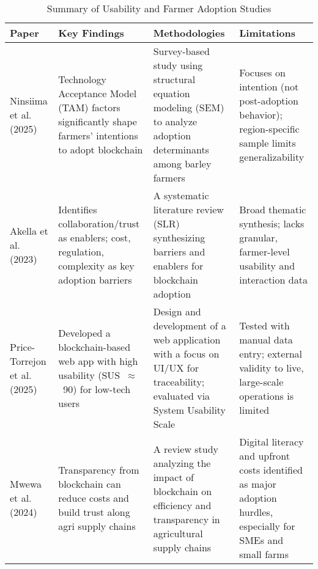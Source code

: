 \documentclass[12pt,onecolumn]{IEEEtran} %
\newcommand{\fitToPage}[1]{\begin{adjustbox}{max width=\textwidth}#1\end{adjustbox}}
\renewcommand{\arraystretch}{1.2} %
\begin{document}
\begin{table}[H]
\caption{Summary of Usability and Farmer Adoption Studies}
\label{table:usability}
\centering
\fitToPage{
\begingroup
\setlength{\tabcolsep}{4pt}
\renewcommand{\arraystretch}{1.15}
\footnotesize
\begin{tabularx}{\textwidth}{@{}P{0.18\textwidth}YYY@{}}
\toprule
\textbf{Paper} & \textbf{Key Findings} & \textbf{Methodologies} & \textbf{Limitations} \\
\midrule
Ninsiima et al. (2025) & Technology Acceptance Model (TAM) factors significantly shape farmers' intentions to adopt blockchain & Survey-based study using structural equation modeling (SEM) to analyze adoption determinants among barley farmers & Focuses on intention (not post-adoption behavior); region-specific sample limits generalizability \\
\addlinespace
Akella et al. (2023) & Identifies collaboration/trust as enablers; cost, regulation, complexity as key adoption barriers & A systematic literature review (SLR) synthesizing barriers and enablers for blockchain adoption & Broad thematic synthesis; lacks granular, farmer-level usability and interaction data \\
\addlinespace
Price-Torrejon et al. (2025) & Developed a blockchain-based web app with high usability (SUS~$\approx$~90) for low-tech users & Design and development of a web application with a focus on UI/UX for traceability; evaluated via System Usability Scale & Tested with manual data entry; external validity to live, large-scale operations is limited \\
\addlinespace
Mwewa et al. (2024) & Transparency from blockchain can reduce costs and build trust along agri supply chains & A review study analyzing the impact of blockchain on efficiency and transparency in agricultural supply chains & Digital literacy and upfront costs identified as major adoption hurdles, especially for SMEs and small farms \\
\bottomrule
\end{tabularx}
\endgroup
}
\end{table}
\end{document}

